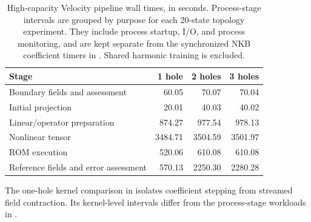 \begin{table}[!htb]\centering\footnotesize\setlength{\tabcolsep}{4pt}
\caption{High-capacity Velocity pipeline wall times, in seconds. Process-stage intervals are grouped by purpose for each 20-state topology experiment. They include process startup, I/O, and process monitoring, and are kept separate from the synchronized NKB coefficient timers in . Shared harmonic training is excluded.}
\label{tab:runtime-topology-pipeline}

\begin{tabular}{lrrr}\toprule
Stage&1 hole&2 holes&3 holes\\\midrule
Boundary fields and assessment & 60.05 & 70.07 & 70.04\\
Initial projection & 20.01 & 40.03 & 40.02\\
Linear/operator preparation & 874.27 & 977.54 & 978.13\\
Nonlinear tensor & 3484.71 & 3504.59 & 3501.97\\
ROM execution & 520.06 & 610.08 & 610.08\\
Reference fields and error assessment & 570.13 & 2250.30 & 2280.28\\
\bottomrule\end{tabular}\end{table}
The one-hole kernel comparison in  isolates coefficient stepping from streamed field contraction. Its kernel-level intervals differ from the process-stage workloads in .


